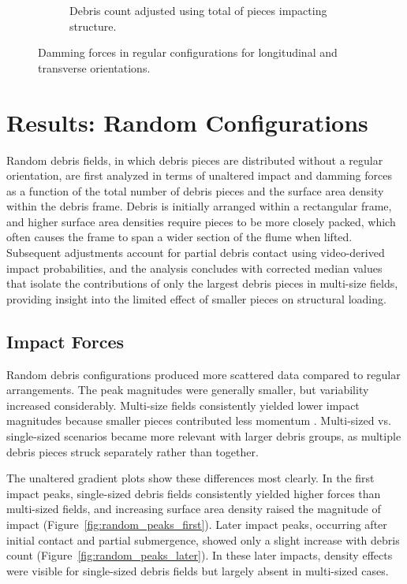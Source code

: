 \documentclass{article}
\begin{document}
\begin{figure}[htbp]
\begin{subfigure}[t]{0.9\textwidth}
        \caption{Debris count adjusted using total of pieces impacting structure.}
        \label{fig:damming_regular_remap}
    \end{subfigure}
    \caption{Damming forces  in regular configurations for longitudinal and transverse orientations.}
    \label{fig:damming_regular_split}
\end{figure}

\section{Results: Random Configurations}
Random debris fields, in which debris pieces are distributed without a regular orientation, are first analyzed in terms of unaltered impact and damming forces as a function of the total number of debris pieces and the surface area density within the debris frame. Debris is initially arranged within a rectangular frame, and higher surface area densities require pieces to be more closely packed, which often causes the frame to span a wider section of the flume when lifted. Subsequent adjustments account for partial debris contact using video-derived impact probabilities, and the analysis concludes with corrected median values that isolate the contributions of only the largest debris pieces in multi-size fields, providing insight into the limited effect of smaller pieces on structural loading.

\subsection{Impact Forces} 
Random debris configurations produced more scattered data compared to regular arrangements. The peak magnitudes were generally smaller, but variability increased considerably. Multi-size fields consistently yielded lower impact magnitudes because
smaller pieces contributed less momentum . Multi-sized vs. single-sized scenarios became more relevant with larger debris groups, as multiple debris pieces struck separately rather than together.

The unaltered gradient plots show these differences most clearly. In the first impact peaks, single-sized debris fields consistently yielded higher forces than multi-sized fields, and increasing surface area density raised the magnitude of impact (Figure~\ref{fig:random_peaks_first}). Later impact peaks, occurring after initial contact and partial submergence, showed only a slight increase with debris count (Figure~\ref{fig:random_peaks_later}). In these later impacts, density effects were visible for single-sized debris fields but largely absent in multi-sized cases.
\end{document}
